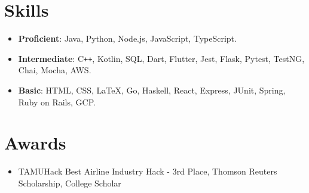 \documentclass[letterpaper,11pt]{article}
\newcommand{\resumeItem}[1]{
  \item\small{
    #1 \vspace{-2pt}
  }
}
\newcommand{\resumeSubItem}[1]{\resumeItem{#1}\vspace{-4pt}}
\newcommand{\resumeSubHeadingListStart}{\begin{itemize}[leftmargin=*]}
\newcommand{\resumeSubHeadingListEnd}{\end{itemize}}
\begin{document}
\section{Skills}
  \resumeSubHeadingListStart
    \resumeSubItem
      {\textbf{Proficient}: Java, Python, Node.js, JavaScript, TypeScript.}
    \resumeSubItem
      {\textbf{Intermediate}: C\texttt{++}, Kotlin, SQL, Dart, Flutter, Jest, Flask, Pytest, TestNG, Chai, Mocha, AWS.}
    \resumeSubItem
      {\textbf{Basic}: HTML, CSS, \LaTeX, Go, Haskell, React, Express, JUnit, Spring, Ruby on Rails, GCP.}
  \resumeSubHeadingListEnd

\section{Awards}
  \resumeSubHeadingListStart
    \resumeSubItem
      {TAMUHack Best Airline Industry Hack - 3rd Place, Thomson Reuters Scholarship, College Scholar}
  \resumeSubHeadingListEnd

\end{document}
